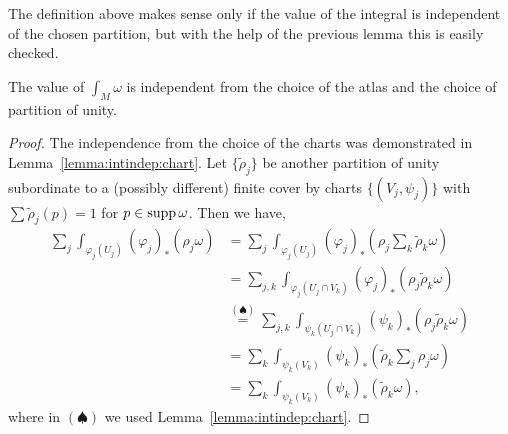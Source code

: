 The definition above makes sense only if the value of the integral is independent of the chosen partition, but with the help of the previous lemma this is easily checked.

\begin{lemma}\label{lemma:intinman}
  The value of $\int_M\omega$ is independent from the choice of the atlas and the choice of partition of unity.
\end{lemma}
\begin{proof}
  The independence from the choice of the charts was demonstrated in Lemma~\ref{lemma:intindep:chart}.
  Let $\{\widetilde\rho_j\}$ be another partition of unity subordinate to a (possibly different) finite cover by charts $\{(V_j, \psi_j)\}$ with $\sum \widetilde\rho_j(p) = 1$ for $p\in\operatorname{supp}\omega$.
  Then we have,
  \begin{align}
    \sum_j \int_{\varphi_j(U_j)} (\varphi_j)_*\left(\rho_j \omega\right)
    &= \sum_j \int_{\varphi_j(U_j)} (\varphi_j)_*\left(\rho_j \sum_k \widetilde\rho_k\omega\right) \\
    &= \sum_{j,k} \int_{\varphi_j(U_j\cap V_k)} (\varphi_j)_* \left(\rho_j \widetilde\rho_k\omega\right) \\
    &\overset{(\spadesuit)}{=} \sum_{j,k} \int_{\psi_k(U_j\cap V_k)} (\psi_k)_* \left(\rho_j \widetilde\rho_k\omega\right) \\
    &= \sum_k \int_{\psi_k(V_k)} (\psi_k)_*\left(\widetilde\rho_k \sum_j\rho_j \omega\right) \\
    &= \sum_k \int_{\psi_k(V_k)} (\psi_k)_*\left( \widetilde\rho_k \omega\right),
  \end{align}
  where in $(\spadesuit)$ we used Lemma~\ref{lemma:intindep:chart}.
\end{proof}

